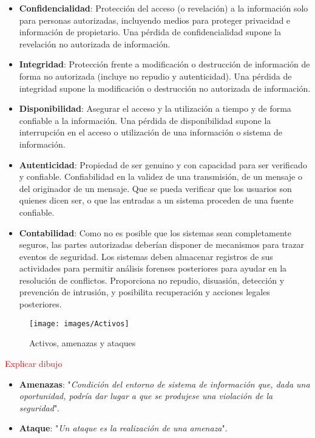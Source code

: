 \documentclass[10pt,portrait, twocolumn]{article}
\begin{document}
	\begin{itemize}
		\item \textbf{Confidencialidad}: Protección del acceso (o revelación) a la información solo para personas autorizadas, incluyendo medios para proteger privacidad e información de propietario. Una pérdida de confidencialidad supone la revelación no autorizada de información.
		\item \textbf{Integridad}: Protección frente a modificación o destrucción de información de forma no autorizada (incluye no repudio y autenticidad). Una pérdida de integridad supone la modificación o destrucción no autorizada de información.
		\item \textbf{Disponibilidad}: Asegurar el acceso y la utilización a tiempo y de forma confiable a la información. Una pérdida de disponibilidad supone la interrupción en el acceso o utilización de una información o sistema de información.
		\item \textbf{Autenticidad}: Propiedad de ser genuino y con capacidad para ser verificado y confiable. Confiabilidad en la validez de una transmisión, de un mensaje o del originador de un mensaje. Que se pueda verificar que los usuarios son quienes dicen ser, o que las entradas a un sistema proceden de una fuente confiable.
		\item \textbf{Contabilidad}: Como no es posible que los sistemas sean completamente seguros, las partes autorizadas deberían disponer de mecanismos para trazar eventos de seguridad. Los sistemas deben almacenar registros de sus actividades para permitir análisis forenses posteriores para ayudar en la resolución de conflictos. Proporciona no repudio, disuasión, detección y prevención de intrusión, y posibilita recuperación y acciones legales posteriores.
	\end{itemize}
	
\begin{figure}[ht!]
	\centering
	\texttt{[image: images/Activos]}
	\caption{Activos, amenazas y ataques}
	\label{fig:Triada}
	\end{figure}
\textcolor{red}{Explicar dibujo}


	\begin{itemize}
		\item \textbf{Amenazas}: "\textit{Condición del entorno de sistema de información que, dada una oportunidad, podría dar lugar a que se produjese una violación de la seguridad}".
		\item \textbf{Ataque}: "\textit{Un ataque es la realización de una amenaza}".
	\end{itemize}
	
\end{document}
